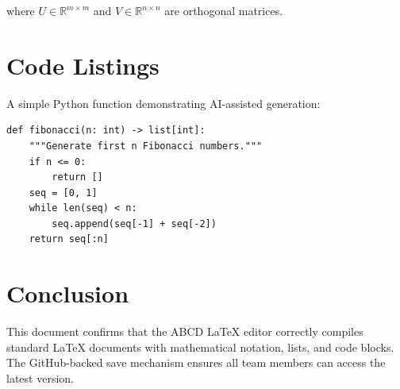 \documentclass[12pt,a4paper]{article}
\begin{document}
where $U \in \mathbb{R}^{m \times m}$ and $V \in \mathbb{R}^{n \times n}$
are orthogonal matrices.

\section{Code Listings}

A simple Python function demonstrating AI-assisted generation:

\begin{verbatim}
def fibonacci(n: int) -> list[int]:
    """Generate first n Fibonacci numbers."""
    if n <= 0:
        return []
    seq = [0, 1]
    while len(seq) < n:
        seq.append(seq[-1] + seq[-2])
    return seq[:n]
\end{verbatim}

\section{Conclusion}

This document confirms that the ABCD LaTeX editor correctly compiles
standard LaTeX documents with mathematical notation, lists, and code
blocks. The GitHub-backed save mechanism ensures all team members can
access the latest version.
\end{document}
